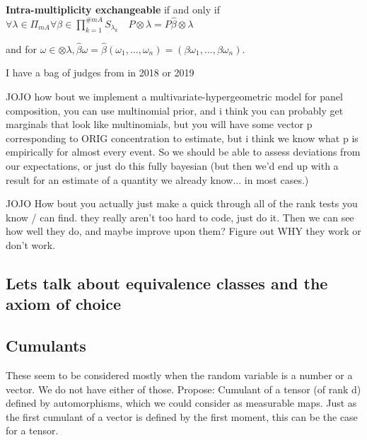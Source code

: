 \documentclass{article}
\theoremstyle{definition}
\begin{document}
\textbf{Intra-multiplicity exchangeable} if and only if 
$ \forall \lambda \in \Pi_{mA} \forall \beta \in \prod_{k=1}^{\#mA} S_{\lambda_k} \quad P\otimes\lambda=P\hat{\beta}\otimes\lambda$

and for $\omega\in\otimes\lambda, \hat{\beta}\omega=\hat{\beta}(\omega_1,\dots,\omega_n) = (\beta\omega_1,\dots,\beta\omega_n)$.

I have a bag of judges from in 2018 or 2019



JOJO how bout we implement a multivariate-hypergeometric model for panel composition, you can use multinomial prior, and i think you can probably get marginals that look like multinomials, but you will have some vector p corresponding to ORIG concentration to estimate, but i think we know what p is empirically for almost every event. So we should be able to assess deviations from our expectations, or just do this fully bayesian (but then we'd end up with a result for an estimate of a quantity we already know... in most cases.)

JOJO How bout you actually just make a quick through all of the rank tests you know / can find. they really aren't too hard to code, just do it. Then we can see how well they do, and maybe improve upon them? Figure out WHY they work or don't work.

\subsection{Lets talk about equivalence classes and the axiom of choice}

\subsection{Cumulants}
These seem to be considered mostly when the random variable is a number or a vector. We do not have either of those.
Propose: Cumulant of a tensor (of rank d) defined by automorphisms, which we could consider as measurable maps. Just as the first cumulant of a vector is defined by the first moment, this can be the case for a tensor. 
\end{document}
